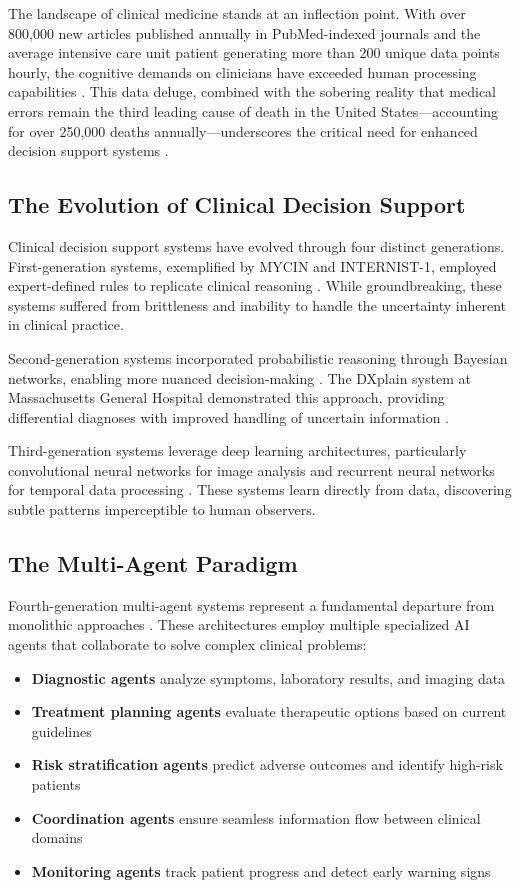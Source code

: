 \documentclass[12pt,letterpaper]{article}
\begin{document}
The landscape of clinical medicine stands at an inflection point. With over 800,000 new articles published annually in PubMed-indexed journals and the average intensive care unit patient generating more than 200 unique data points hourly, the cognitive demands on clinicians have exceeded human processing capabilities \citep{landhuis2016, wright2016}. This data deluge, combined with the sobering reality that medical errors remain the third leading cause of death in the United States—accounting for over 250,000 deaths annually—underscores the critical need for enhanced decision support systems \citep{makary2016}.

\subsection{The Evolution of Clinical Decision Support}

Clinical decision support systems have evolved through four distinct generations. First-generation systems, exemplified by MYCIN and INTERNIST-1, employed expert-defined rules to replicate clinical reasoning \citep{shortliffe1976, miller1982}. While groundbreaking, these systems suffered from brittleness and inability to handle the uncertainty inherent in clinical practice.

Second-generation systems incorporated probabilistic reasoning through Bayesian networks, enabling more nuanced decision-making \citep{lucas2004}. The DXplain system at Massachusetts General Hospital demonstrated this approach, providing differential diagnoses with improved handling of uncertain information \citep{barnett1987}.

Third-generation systems leverage deep learning architectures, particularly convolutional neural networks for image analysis and recurrent neural networks for temporal data processing \citep{lecun2015, esteva2017}. These systems learn directly from data, discovering subtle patterns imperceptible to human observers.

\subsection{The Multi-Agent Paradigm}

Fourth-generation multi-agent systems represent a fundamental departure from monolithic approaches \citep{wooldridge2009}. These architectures employ multiple specialized AI agents that collaborate to solve complex clinical problems:

\begin{itemize}
\item \textbf{Diagnostic agents} analyze symptoms, laboratory results, and imaging data
\item \textbf{Treatment planning agents} evaluate therapeutic options based on current guidelines
\item \textbf{Risk stratification agents} predict adverse outcomes and identify high-risk patients
\item \textbf{Coordination agents} ensure seamless information flow between clinical domains
\item \textbf{Monitoring agents} track patient progress and detect early warning signs
\end{itemize}
\end{document}
